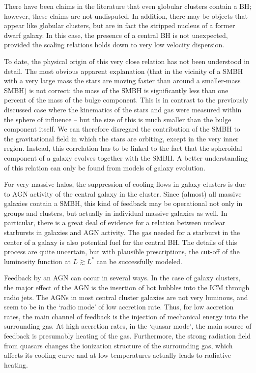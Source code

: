 \documentclass[a4paper,11pt]{article}
\begin{document}
{\noindent}There have been claims in the literature that even globular clusters contain a BH; however, these claims are not undisputed. In addition, there may be objects that appear like globular clusters, but are in fact the stripped nucleus of a former dwarf galaxy. In this case, the presence of a central BH is not unexpected, provided the scaling relations holds down to very low velocity dispersion.

{\noindent}To date, the physical origin of this very close relation has not been understood in detail. The most obvious apparent explanation (that in the vicinity of a SMBH with a very large mass the stars are moving faster than around a smaller-mass SMBH) is not correct: the mass of the SMBH is significantly less than one percent of the mass of the bulge component. This is in contrast to the previously discussed case where the kinematics of the stars and gas were measured within the sphere of influence -- but the size of this is much smaller than the bulge component itself. We can therefore disregard the contribution of the SMBH to the gravitational field in which the stars are orbiting, except in the very inner region. Instead, this correlation has to be linked to the fact that the spheroidal component of a galaxy evolves together with the SMBH. A better understanding of this relation can only be found from models of galaxy evolution.

{\noindent}For very massive halos, the suppression of cooling flows in galaxy clusters is due to AGN activity of the central galaxy in the cluster. Since (almost) all massive galaxies contain a SMBH, this kind of feedback may be operational not only in groups and clusters, but actually in individual massive galaxies as well. In particular, there is a great deal of evidence for a relation between nuclear starbursts in galaxies and AGN activity. The gas needed for a starburst in the center of a galaxy is also potential fuel for the central BH. The details of this process are quite uncertain, but with plausible prescriptions, the cut-off of the luminosity function at $L\gtrsim L^*$ can be successfully modeled.

{\noindent}Feedback by an AGN can occur in several ways. In the case of galaxy clusters, the major effect of the AGN is the insertion of hot bubbles into the ICM through radio jets. The AGNs in most central cluster galaxies are not very luminous, and seem to be in the `radio mode' of low accretion rate. Thus, for low accretion rates, the main channel of feedback is the injection of mechanical energy into the surrounding gas. At high accretion rates, in the `quasar mode', the main source of feedback is presumably heating of the gas. Furthermore, the strong radiation field from quasars changes the ionization structure of the surrounding gas, which affects its cooling curve and at low temperatures actually leads to radiative heating.
\end{document}
